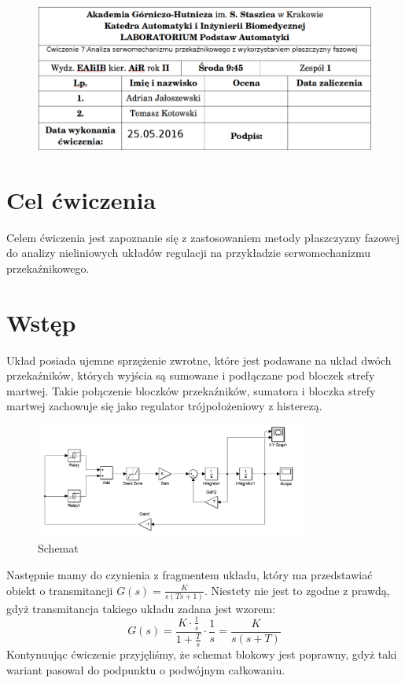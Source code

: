 \documentclass[a4paper, 12pt]{article}
\begin{document}
	\begin{figure}[H]
		\centering
		\includegraphics[width = \textwidth]{./img/cudo.png}
	\end{figure}
	\section{Cel ćwiczenia}
		Celem ćwiczenia jest zapoznanie się z zastosowaniem metody płaszczyzny fazowej do analizy nieliniowych układów regulacji na przykładzie serwomechanizmu przekaźnikowego. 
	\section{Wstęp}
		Układ posiada ujemne sprzężenie zwrotne, które jest podawane na układ dwóch przekaźników, których wyjścia są sumowane i podłączane pod bloczek strefy martwej. Takie połączenie bloczków przekaźników, sumatora i bloczka strefy martwej zachowuje się jako regulator trójpołożeniowy z histerezą.
		\begin{figure}[H]
			\centering
			\includegraphics[width = 0.8\textwidth]{./img/uklad.png}
			\caption{Schemat}
		\end{figure} \noindent
		Następnie mamy do czynienia z fragmentem układu, który ma przedstawiać obiekt o transmitancji $G(s) = \frac{K}{s(Ts+1)}$. Niestety nie jest to zgodne z prawdą, gdyż transmitancja takiego układu zadana jest wzorem:
		$$
			G(s) = \frac{K\cdot \frac{1}{s}}{1+\frac{T}{s}} \cdot \frac{1}{s} = \frac{K}{s(s+T)}
		$$
		Kontynuując ćwiczenie przyjęliśmy, że schemat blokowy jest poprawny, gdyż taki wariant pasował do podpunktu o podwójnym całkowaniu.
\end{document}

